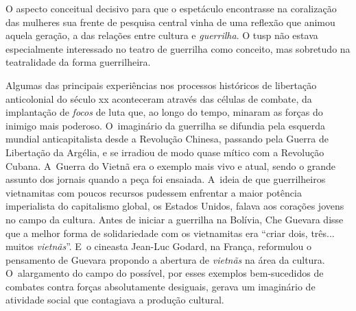 
\subject{Imaginário guerrilheiro}

O aspecto conceitual decisivo para que o espetáculo encontrasse na
coralização das mulheres sua frente de pesquisa central vinha de uma
reflexão que animou aquela geração, a das relações entre cultura e
{\it guerrilha}. O {\sc tusp} não estava especialmente interessado no
teatro de guerrilha como conceito, mas sobretudo na teatralidade
da forma guerrilheira.

Algumas das principais experiências nos processos históricos de
libertação anticolonial do século {\sc xx} aconteceram através das células de
combate, da implantação de {\it focos} de luta que, ao longo do tempo,
minaram as forças do inimigo mais poderoso. O~imaginário da
guerrilha se difundia pela esquerda mundial anticapitalista desde a
Revolução Chinesa, passando pela Guerra de Libertação da Argélia, e se
irradiou de modo quase mítico com a Revolução Cubana. A~Guerra do Vietnã
era o exemplo mais vivo e atual, sendo o grande assunto dos jornais
quando a peça foi ensaiada. A~ideia de que guerrilheiros vietnamitas com
poucos recursos pudessem enfrentar a maior potência imperialista do
capitalismo global, os Estados Unidos, falava aos corações jovens no
campo da cultura. Antes de iniciar a guerrilha na Bolívia, Che Guevara 
disse que a melhor forma de solidariedade com os vietnamitas era “criar
dois, três... muitos {\it vietnãs}”. E~o cineasta Jean-Luc Godard, na
França, reformulou o pensamento de Guevara propondo a abertura de
{\it vietnãs} na área da cultura. O~alargamento do campo do possível,
por esses exemplos bem-sucedidos de combates contra forças absolutamente
desiguais, gerava um imaginário de atividade social que contagiava a
produção cultural.

